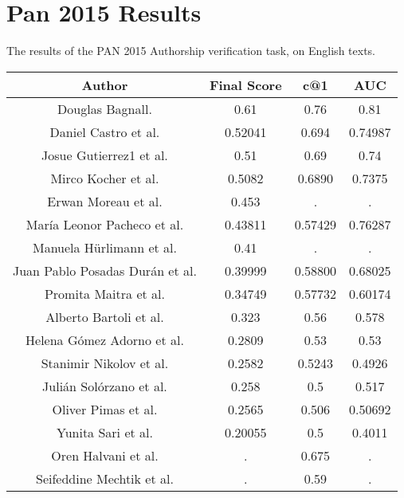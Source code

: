 \section{Pan 2015 Results} \label{sec:appendix:pan_2015_results}
The results of the PAN 2015 Authorship verification task, on English texts.

\begin{center}
\begin{tabular}{|c|c|c|c|}
\hline
\textbf{Author}                 & \textbf{Final Score} & \textbf{c@1} & \textbf{AUC} \\ \hline
Douglas Bagnall.                & 0.61                 & 0.76         & 0.81         \\ \hline
Daniel Castro et al.            & 0.52041              & 0.694        & 0.74987      \\ \hline
Josue Gutierrez1 et al.         & 0.51                 & 0.69         & 0.74         \\ \hline
Mirco Kocher et al.             & 0.5082               & 0.6890       & 0.7375       \\ \hline
Erwan Moreau et al.             & 0.453                & .            & .            \\ \hline
María Leonor Pacheco et al.     & 0.43811              & 0.57429      & 0.76287      \\ \hline
Manuela Hürlimann et al.        & 0.41                 & .            & .            \\ \hline
Juan Pablo Posadas Durán et al. & 0.39999              & 0.58800      & 0.68025      \\ \hline
Promita Maitra et al.           & 0.34749              & 0.57732      & 0.60174      \\ \hline
Alberto Bartoli et al.          & 0.323                & 0.56         & 0.578        \\ \hline
Helena Gómez Adorno et al.      & 0.2809               & 0.53         & 0.53         \\ \hline
Stanimir Nikolov et al.         & 0.2582               & 0.5243       & 0.4926       \\ \hline
Julián Solórzano et al.         & 0.258                & 0.5          & 0.517        \\ \hline
Oliver Pimas et al.             & 0.2565               & 0.506        & 0.50692      \\ \hline
Yunita Sari et al.              & 0.20055              & 0.5          & 0.4011       \\ \hline
Oren Halvani et al.             & .                    & 0.675        & .            \\ \hline
Seifeddine Mechtik et al.       & .                    & 0.59         & .            \\ \hline
\end{tabular}
\end{center}
